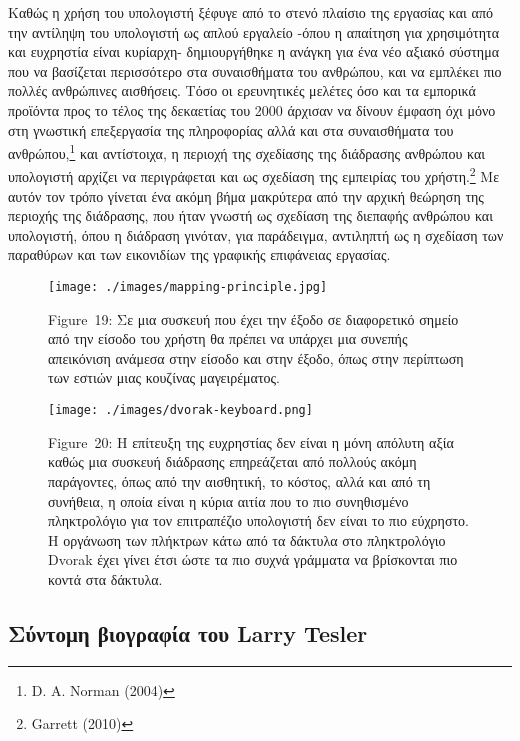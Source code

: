 \documentclass[
]{article}
\begin{document}
Καθώς η χρήση του υπολογιστή ξέφυγε από το στενό πλαίσιο της εργασίας
και από την αντίληψη του υπολογιστή ως απλού εργαλείο -όπου η απαίτηση
για χρησιμότητα και ευχρηστία είναι κυρίαρχη- δημιουργήθηκε η ανάγκη για
ένα νέο αξιακό σύστημα που να βασίζεται περισσότερο στα συναισθήματα του
ανθρώπου, και να εμπλέκει πιο πολλές ανθρώπινες αισθήσεις. Τόσο οι
ερευνητικές μελέτες όσο και τα εμπορικά προϊόντα προς το τέλος της
δεκαετίας του 2000 άρχισαν να δίνουν έμφαση όχι μόνο στη γνωστική
επεξεργασία της πληροφορίας αλλά και στα συναισθήματα του
ανθρώπου,\footnote{D. A. Norman (2004)} και αντίστοιχα, η περιοχή της
σχεδίασης της διάδρασης ανθρώπου και υπολογιστή αρχίζει να περιγράφεται
και ως σχεδίαση της εμπειρίας του χρήστη.\footnote{Garrett (2010)} Με
αυτόν τον τρόπο γίνεται ένα ακόμη βήμα μακρύτερα από την αρχική θεώρηση
της περιοχής της διάδρασης, που ήταν γνωστή ως σχεδίαση της διεπαφής
ανθρώπου και υπολογιστή, όπου η διάδραση γινόταν, για παράδειγμα,
αντιληπτή ως η σχεδίαση των παραθύρων και των εικονιδίων της γραφικής
επιφάνειας εργασίας.

\leavevmode{}%
\begin{figure}
\hypertarget{fig:mapping-principle}{%
\centering
\texttt{[image: ./images/mapping-principle.jpg]}
\caption{Figure~19: Σε μια συσκευή που έχει την έξοδο σε διαφορετικό
σημείο από την είσοδο του χρήστη θα πρέπει να υπάρχει μια συνεπής
απεικόνιση ανάμεσα στην είσοδο και στην έξοδο, όπως στην περίπτωση των
εστιών μιας κουζίνας μαγειρέματος.}\label{fig:mapping-principle}
}
\end{figure}

\leavevmode{}%
\begin{figure}
\hypertarget{fig:dvorak-keyboard}{%
\centering
\texttt{[image: ./images/dvorak-keyboard.png]}
\caption{Figure~20: Η επίτευξη της ευχρηστίας δεν είναι η μόνη απόλυτη
αξία καθώς μια συσκευή διάδρασης επηρεάζεται από πολλούς ακόμη
παράγοντες, όπως από την αισθητική, το κόστος, αλλά και από τη συνήθεια,
η οποία είναι η κύρια αιτία που το πιο συνηθισμένο πληκτρολόγιο για τον
επιτραπέζιο υπολογιστή δεν είναι το πιο εύχρηστο. Η οργάνωση των
πλήκτρων κάτω από τα δάκτυλα στο πληκτρολόγιο Dvorak έχει γίνει έτσι
ώστε τα πιο συχνά γράμματα να βρίσκονται πιο κοντά στα
δάκτυλα.}\label{fig:dvorak-keyboard}
}
\end{figure}

\hypertarget{ux3c3ux3cdux3bdux3c4ux3bfux3bcux3b7-ux3b2ux3b9ux3bfux3b3ux3c1ux3b1ux3c6ux3afux3b1-ux3c4ux3bfux3c5-larry-tesler}{%
\subsection{Σύντομη βιογραφία του Larry
Tesler}\label{ux3c3ux3cdux3bdux3c4ux3bfux3bcux3b7-ux3b2ux3b9ux3bfux3b3ux3c1ux3b1ux3c6ux3afux3b1-ux3c4ux3bfux3c5-larry-tesler}}
\end{document}
